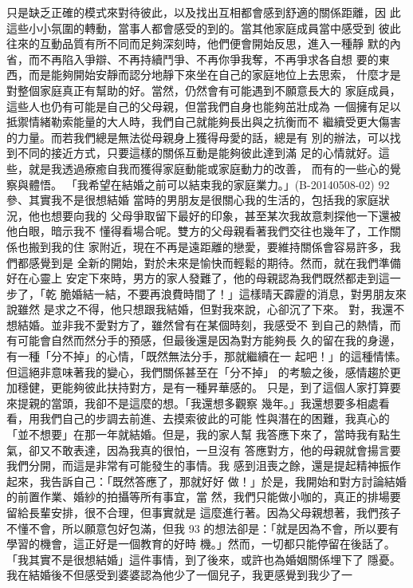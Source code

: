 只是缺乏正確的模式來對待彼此，以及找出互相都會感到舒適的關係距離，因
此這些小小氛圍的轉動，當事人都會感受的到的。當其他家庭成員當中感受到
彼此往來的互動品質有所不同而足夠深刻時，他們便會開始反思，進入一種靜
默的內省，而不再陷入爭辯、不再持續鬥爭、不再你爭我奪，不再爭求各自想
要的東西，而是能夠開始安靜而認分地靜下來坐在自己的家庭地位上去思索，
什麼才是對整個家庭真正有幫助的好。當然，仍然會有可能遇到不願意長大的
家庭成員，這些人也仍有可能是自己的父母親，但當我們自身也能夠茁壯成為
一個擁有足以抵禦情緒勒索能量的大人時，我們自己就能夠長出與之抗衡而不
繼續受更大傷害的力量。而若我們總是無法從母親身上獲得母愛的話，總是有
別的辦法，可以找到不同的接近方式，只要這樣的關係互動是能夠彼此達到滿
足的心情就好。這些，就是我透過療癒自我而獲得家庭動能或家庭動力的改善，
而有的一些心的覺察與體悟。 
「我希望在結婚之前可以結束我的家庭業力。」(B-20140508-02) 
92 
參、其實我不是很想結婚 
當時的男朋友是很關心我的生活的，包括我的家庭狀況，他也想要向我的
父母爭取留下最好的印象，甚至某次我故意刺探他一下還被他白眼，暗示我不
懂得看場合呢。雙方的父母親看著我們交往也幾年了，工作關係也搬到我的住
家附近，現在不再是遠距離的戀愛，要維持關係會容易許多，我們都感覺到是
全新的開始，對於未來是愉快而輕鬆的期待。然而，就在我們準備好在心靈上
安定下來時，男方的家人發難了，他的母親認為我們既然都走到這一步了，「乾
脆婚結一結，不要再浪費時間了！」這樣晴天霹靂的消息，對男朋友來說雖然
是求之不得，他只想跟我結婚，但對我來說，心卻沉了下來。 
對，我還不想結婚。並非我不愛對方了，雖然曾有在某個時刻，我感受不
到自己的熱情，而有可能會自然而然分手的預感，但最後還是因為對方能夠長
久的留在我的身邊，有一種「分不掉」的心情，「既然無法分手，那就繼續在一
起吧！」的這種情愫。但這絕非意味著我的變心，我們關係甚至在「分不掉」
的考驗之後，感情趨於更加穩健，更能夠彼此扶持對方，是有一種昇華感的。
只是，到了這個人家打算要來提親的當頭，我卻不是這麼的想。「我還想多觀察
幾年。」我還想要多相處看看，用我們自己的步調去前進、去摸索彼此的可能
性與潛在的困難，我真心的「並不想要」在那一年就結婚。但是，我的家人幫
我答應下來了，當時我有點生氣，卻又不敢表達，因為我真的很怕，一旦沒有
答應對方，他的母親就會揚言要我們分開，而這是非常有可能發生的事情。我
感到沮喪之餘，還是提起精神振作起來，我告訴自己：「既然答應了，那就好好
做！」於是，我開始和對方討論結婚的前置作業、婚紗的拍攝等所有事宜，當
然，我們只能做小咖的，真正的排場要留給長輩安排，很不合理，但事實就是
這麼進行著。因為父母親想著，我們孩子不懂不會，所以願意包好包滿，但我
93 
的想法卻是：「就是因為不會，所以要有學習的機會，這正好是一個教育的好時
機。」然而，一切都只能停留在後話了。 
「我其實不是很想結婚」這件事情，到了後來，或許也為婚姻關係埋下了
隱憂。我在結婚後不但感受到婆婆認為他少了一個兒子，我更感覺到我少了一
